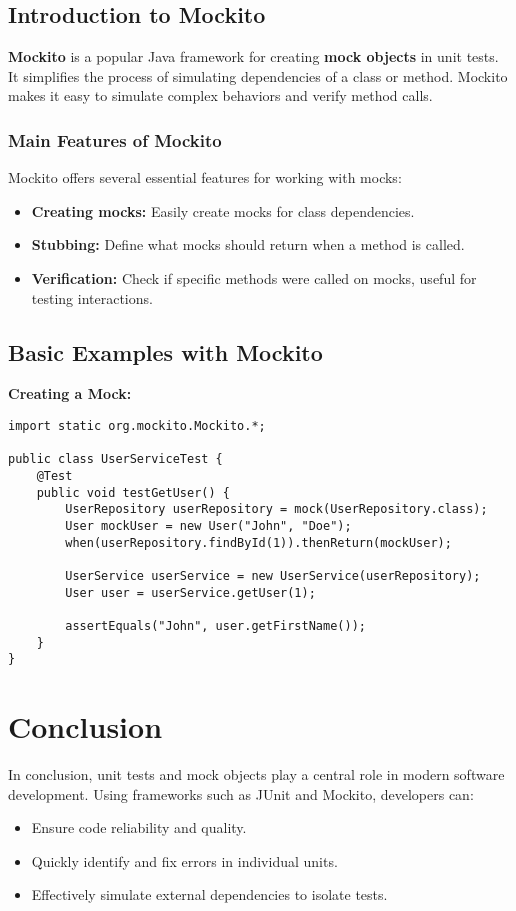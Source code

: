 \documentclass[12pt,a4paper]{article}
\begin{document}
\subsection{Introduction to Mockito}
\textbf{Mockito} is a popular Java framework for creating \textbf{mock objects} in unit tests. It simplifies the process of simulating dependencies of a class or method. Mockito makes it easy to simulate complex behaviors and verify method calls.

\subsubsection{Main Features of Mockito}
Mockito offers several essential features for working with mocks:
\begin{itemize}
    \item \textbf{Creating mocks:} Easily create mocks for class dependencies.
    \item \textbf{Stubbing:} Define what mocks should return when a method is called.
    \item \textbf{Verification:} Check if specific methods were called on mocks, useful for testing interactions.
\end{itemize}

\subsection{Basic Examples with Mockito}
\textbf{Creating a Mock:}
\begin{lstlisting}
import static org.mockito.Mockito.*;

public class UserServiceTest {
    @Test
    public void testGetUser() {
        UserRepository userRepository = mock(UserRepository.class);
        User mockUser = new User("John", "Doe");
        when(userRepository.findById(1)).thenReturn(mockUser);

        UserService userService = new UserService(userRepository);
        User user = userService.getUser(1);

        assertEquals("John", user.getFirstName());
    }
}
\end{lstlisting}

\section*{Conclusion}
In conclusion, unit tests and mock objects play a central role in modern software development. Using frameworks such as JUnit and Mockito, developers can:
\begin{itemize}
    \item Ensure code reliability and quality.
    \item Quickly identify and fix errors in individual units.
    \item Effectively simulate external dependencies to isolate tests.
\end{itemize}
\end{document}
